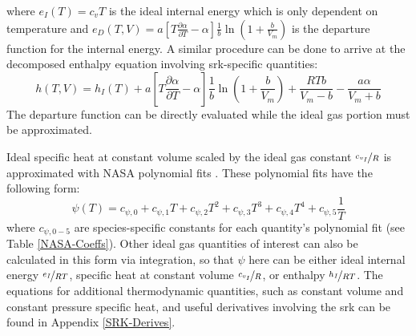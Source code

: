 where $e_I(T)=c_vT$ is the ideal internal energy which is only dependent on temperature and $e_D(T,V) = a \left[ T \tfrac{\partial \alpha}{\partial T} - \alpha \right] \tfrac{1}{b}\ln\left( 1 + \tfrac{b}{V_m} \right)$ is the departure function for the internal energy. A similar procedure can be done to arrive at the decomposed enthalpy equation involving \gls{srk}-specific quantities:
\begin{equation} \label{thermo_enthalpy}
h(T,V) = h_I(T) +  a \left[ T \dfrac{\partial \alpha}{\partial T} - \alpha \right] \dfrac{1}{b}\ln\left( 1 + \dfrac{b}{V_m} \right) + \dfrac{RTb}{V_m - b} - \dfrac{a \alpha}{V_m + b}
\end{equation}
The departure function can be directly evaluated while the ideal gas portion must be approximated.

Ideal specific heat at constant volume scaled by the ideal gas constant $\nicefrac{c_{v_I}}{R}$ is approximated with NASA polynomial fits \cite{NASAPoly}. These polynomial fits have the following form:
\begin{equation} \label{NASA_poly}
\psi(T) = c_{\psi, 0} + c_{\psi, 1}T + c_{\psi, 2}T^2 + c_{\psi, 3}T^3 + c_{\psi, 4}T^4  + c_{\psi, 5}\dfrac{1}{T}
\end{equation}
where $c_{\psi,0-5}$ are species-specific constants for each quantity's polynomial fit (see Table \ref{NASA-Coeffs}). Other ideal gas quantities of interest can also be calculated in this form via integration, so that $\psi$ here can be either ideal internal energy $\nicefrac{e_I}{RT}$, specific heat at constant volume $\nicefrac{c_{v_I}}{R}$, or enthalpy $\nicefrac{h_I}{RT}$. 
The equations for additional thermodynamic quantities, such as constant volume and constant pressure specific heat, and useful derivatives involving the \gls{srk} can be found in Appendix \ref{SRK-Derives}. 

